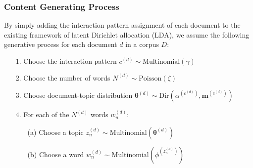 \documentclass[a4paper]{article}
\begin{document}
\subsubsection{Content Generating Process}
By simply adding the interaction pattern assignment of each document to the existing framework of latent Dirichlet allocation (LDA), we assume the following generative process for each document $d$ in a corpus $D$:
\begin{itemize}
	\item[1.] Choose the interaction pattern $c^{(d)} \sim \mbox{Multinomial}(\gamma)$
	\item[2.] Choose the number of words $N^{(d)} \sim \mbox{Poisson}(\zeta)$
	\item[3.] Choose document-topic distribution $\boldsymbol{\theta}^{(d)}\sim \mbox{Dir}(\alpha^{(c^{(d)})}, \boldsymbol{m}^{(c^{(d)})})$
	\item[4.] For each of the $N^{(d)}$ words $w_n^{(d)}$:
 		\begin{itemize}
 			\item[(a)] Choose a topic $z_n^{(d)} \sim \mbox{Multinomial}(\boldsymbol{\theta}^{(d)})$
 			\item[(b)] Choose a word $w_n^{(d)} \sim\mbox{Multinomial} (\phi^{(z_n^{(d)})})$
 		\end{itemize}
\end{itemize}
\end{document}
